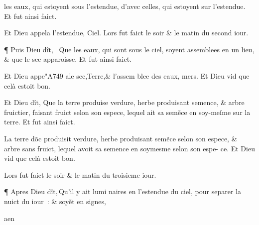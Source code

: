 \documentclass[twocolumn,paper=a4,pagesize=pdftex,12pt,headinclude=on]{scrbook}
\newcounter{verse}
\newcommand{\bverse}{%
  \addtocounter{verse}{1}
  \theverse\quad
}
\begin{document}
 \noindent les eaux, qui estoyent sous
 l'estendue, d'avec celles, qui estoyent sur l'esten\-due. Et fut ainsi faict.

\bverse Et Dieu appela l'estendue, Ciel.
 Lors fut faict le soir \& le matin du second iour.

\bverse ¶ Puis Dieu dît, 
 \footnotemarkverse{}~\footnotemark{}Que les eaux,
 qui sont sous le ciel,
 soyent assemblees en un lieu, \& que le sec apparoisse. Et fut ainsi faict.

\bverse Et Dieu appe\char"A749 ale sec,Terre,\& l'assem \linebreak
 blee des eaux, mers.
 Et Dieu vid que celà estoit bon.

\bverse Et Dieu dît, Que la terre produise verdure, herbe produisant semence,
 \& arbre fruictier, faisant fruict selon son espece, lequel ait sa sem\~ece
 en soy-meſ\-me sur la terre. Et fut ainsi faict.

\bverse La terre d\~oc produisit verdure, her\-be produisant sem\~ece
 selon son espece, \& arbre sans fruict, lequel avoit sa \linebreak
  semence en soymesme selon son espe- \linebreak
 ce. Et Dieu vid que celà estoit bon.

\bverse Lors fut faict le soir \& le matin du troisieme iour.

\addtocounter{footnote}{1}

\bverse ¶ Apres Dieu dît,\footnotemarkverse{}\,\footnotemark{}Qu'il y ait lumi \linebreak
 naires en l'estendue du ciel, pour
 sepa\-rer la nuict du iour~: \& soy\~et en
 \footnotemark{}signes,

\raggedleft a\quad en
\end{document}
